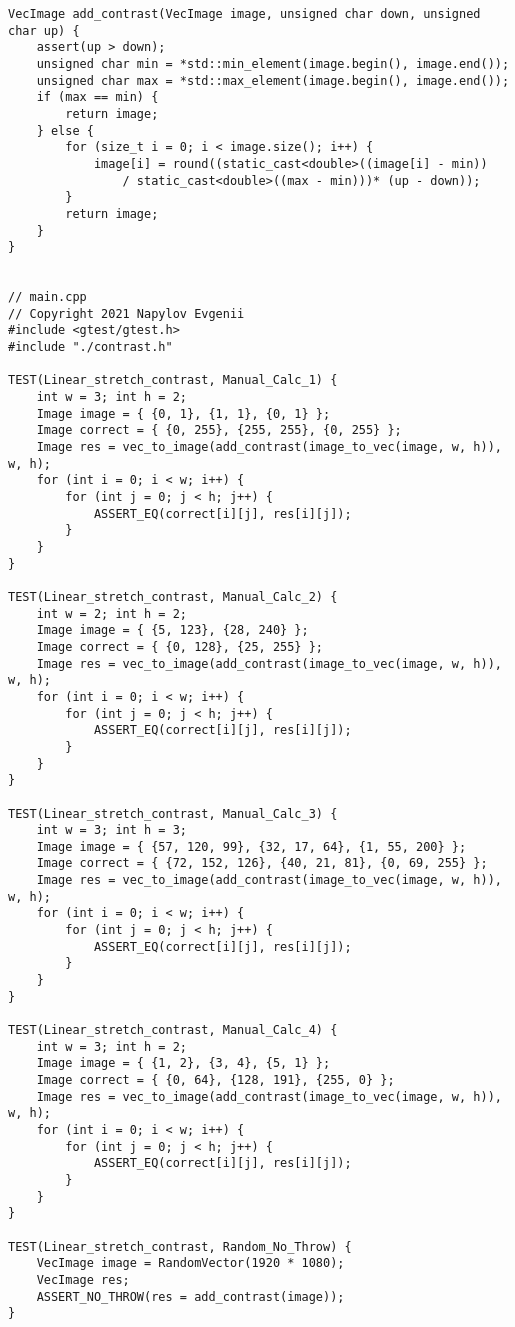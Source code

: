\documentclass{report}
\begin{document}
\begin{lstlisting}
VecImage add_contrast(VecImage image, unsigned char down, unsigned char up) {
    assert(up > down);
    unsigned char min = *std::min_element(image.begin(), image.end());
    unsigned char max = *std::max_element(image.begin(), image.end());
    if (max == min) {
        return image;
    } else {
        for (size_t i = 0; i < image.size(); i++) {
            image[i] = round((static_cast<double>((image[i] - min))
                / static_cast<double>((max - min)))* (up - down));
        }
        return image;
    }
}


// main.cpp
// Copyright 2021 Napylov Evgenii
#include <gtest/gtest.h>
#include "./contrast.h"

TEST(Linear_stretch_contrast, Manual_Calc_1) {
    int w = 3; int h = 2;
    Image image = { {0, 1}, {1, 1}, {0, 1} };
    Image correct = { {0, 255}, {255, 255}, {0, 255} };
    Image res = vec_to_image(add_contrast(image_to_vec(image, w, h)), w, h);
    for (int i = 0; i < w; i++) {
        for (int j = 0; j < h; j++) {
            ASSERT_EQ(correct[i][j], res[i][j]);
        }
    }
}

TEST(Linear_stretch_contrast, Manual_Calc_2) {
    int w = 2; int h = 2;
    Image image = { {5, 123}, {28, 240} };
    Image correct = { {0, 128}, {25, 255} };
    Image res = vec_to_image(add_contrast(image_to_vec(image, w, h)), w, h);
    for (int i = 0; i < w; i++) {
        for (int j = 0; j < h; j++) {
            ASSERT_EQ(correct[i][j], res[i][j]);
        }
    }
}

TEST(Linear_stretch_contrast, Manual_Calc_3) {
    int w = 3; int h = 3;
    Image image = { {57, 120, 99}, {32, 17, 64}, {1, 55, 200} };
    Image correct = { {72, 152, 126}, {40, 21, 81}, {0, 69, 255} };
    Image res = vec_to_image(add_contrast(image_to_vec(image, w, h)), w, h);
    for (int i = 0; i < w; i++) {
        for (int j = 0; j < h; j++) {
            ASSERT_EQ(correct[i][j], res[i][j]);
        }
    }
}

TEST(Linear_stretch_contrast, Manual_Calc_4) {
    int w = 3; int h = 2;
    Image image = { {1, 2}, {3, 4}, {5, 1} };
    Image correct = { {0, 64}, {128, 191}, {255, 0} };
    Image res = vec_to_image(add_contrast(image_to_vec(image, w, h)), w, h);
    for (int i = 0; i < w; i++) {
        for (int j = 0; j < h; j++) {
            ASSERT_EQ(correct[i][j], res[i][j]);
        }
    }
}

TEST(Linear_stretch_contrast, Random_No_Throw) {
    VecImage image = RandomVector(1920 * 1080);
    VecImage res;
    ASSERT_NO_THROW(res = add_contrast(image));
}
	\end{lstlisting}
	
\end{document}
